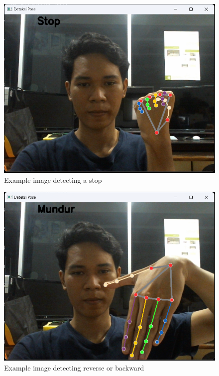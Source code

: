 \begin{figure} [h] \centering
  \includegraphics[scale=0.48]{gambar/bab3/Stop.png}
  \caption{Example image detecting a stop}
  \label{fig:klasifikasi stop}
\end{figure}

\begin{figure} [!ht] \centering
  \includegraphics[scale=0.48]{gambar/bab3/Mundur.png}
  \caption{Example image detecting reverse or backward}
  \label{fig:klasifikasi mundur}
\end{figure}


